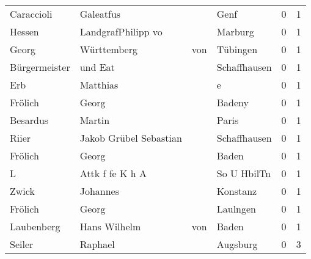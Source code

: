 \begin{center}
\begin{tiny}
\begin{longtabu}{llllrr}
               Caraccioli &                          Galeatfus &             &                                        Genf &          0 &         1 \\
                   Hessen &                 LandgrafPhilipp vo &             &                                     Marburg &          0 &         1 \\
                    Georg &                        Württemberg &         von &                                    Tübingen &          0 &         1 \\
            Bürgermeister &                            und Eat &             &                                Schaffhausen &          0 &         1 \\
                      Erb &                           Matthias &             &                                           e &          0 &         1 \\
                  Frölich &                              Georg &             &                                      Badeny &          0 &         1 \\
                 Besardus &                             Martin &             &                                       Paris &          0 &         1 \\
                    Riier &             Jakob Grübel Sebastian &             &                                Schaffhausen &          0 &         1 \\
                  Frölich &                              Georg &             &                                       Baden &          0 &         1 \\
                        L &                    Attk f fe K h A &             &                                 So U HbilTn &          0 &         1 \\
                    Zwick &                           Johannes &             &                                    Konstanz &          0 &         1 \\
                  Frölich &                              Georg &             &                                    Laulngen &          0 &         1 \\
               Laubenberg &                       Hans Wilhelm &         von &                                       Baden &          0 &         1 \\
                   Seiler &                            Raphael &             &                                    Augsburg &          0 &         3 \\

\end{longtabu}
\end{tiny}
\end{center}
